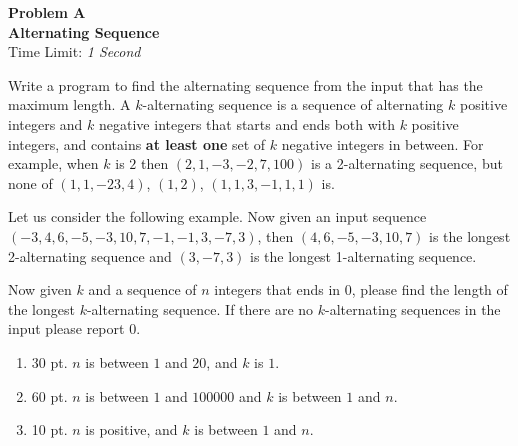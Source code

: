\documentclass[12pt,psfig,epsf]{article}
\begin{document}
\begin{center}
   {\Large\bfseries Problem A}\\			%
   {\large\bf Alternating Sequence}\\			%
   {\large Time Limit: {\em 1 Second}}\\	%
\end{center}



Write a program to find the alternating sequence from the input that has the maximum length. A $k$-alternating sequence is a sequence of alternating $k$ positive integers and $k$ negative integers that starts and ends both with $k$ positive integers, and contains \textbf{at least one} set of $k$ negative integers in between. For example, when $k$ is $2$ then $(2, 1, -3, -2, 7, 100)$ is a 2-alternating sequence, but none of $(1, 1, -23, 4)$, $(1, 2)$, $(1, 1, 3, -1, 1, 1)$ is. 

Let us consider the following example. Now given an input sequence $(-3, 4, 6, -5, -3, 10, 7, -1, -1, 3, -7, 3)$, then $(4, 6, -5, -3, 10, 7)$ is the longest 2-alternating sequence and $(3, -7, 3)$ is the longest 1-alternating sequence. 

Now given $k$ and a sequence of $n$ integers that ends in $0$, please find the length of the longest $k$-alternating sequence. If there are no $k$-alternating sequences in the input please report $0$.



\vspace*{.3in} 
\begin{enumerate}
\item 30 pt. $n$ is between $1$ and $20$, and $k$ is $1$.
\item 60 pt. $n$ is between $1$ and $100000$ and $k$ is between $1$ and $n$. 
\item 10 pt. $n$ is positive, and $k$ is between $1$ and $n$.
\end{enumerate}

\end{document}
